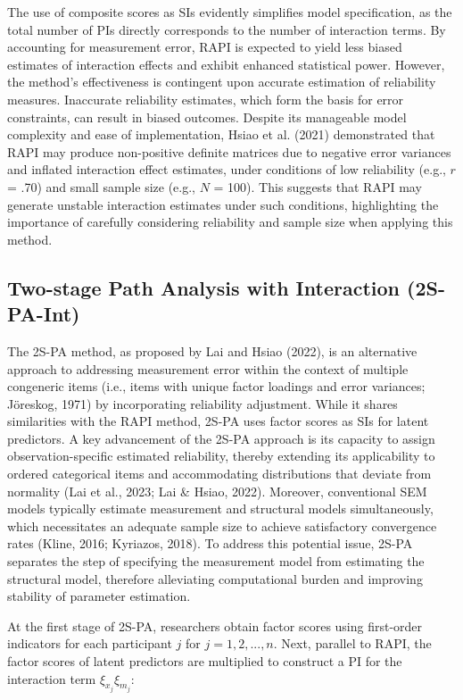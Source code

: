\documentclass[
  man]{apa6}
\begin{document}
The use of composite scores as SIs evidently simplifies model specification, as the total number of PIs directly corresponds to the number of interaction terms. By accounting for measurement error, RAPI is expected to yield less biased estimates of interaction effects and exhibit enhanced statistical power. However, the method's effectiveness is contingent upon accurate estimation of reliability measures. Inaccurate reliability estimates, which form the basis for error constraints, can result in biased outcomes. Despite its manageable model complexity and ease of implementation, Hsiao et al. (2021) demonstrated that RAPI may produce non-positive definite matrices due to negative error variances and inflated interaction effect estimates, under conditions of low reliability (e.g., \(\textit{r}\) = .70) and small sample size (e.g., \(\textit{N}\) = 100). This suggests that RAPI may generate unstable interaction estimates under such conditions, highlighting the importance of carefully considering reliability and sample size when applying this method.

\subsection{Two-stage Path Analysis with Interaction (2S-PA-Int)}\label{two-stage-path-analysis-with-interaction-2s-pa-int}

The 2S-PA method, as proposed by Lai and Hsiao (2022), is an alternative approach to addressing measurement error within the context of multiple congeneric items (i.e., items with unique factor loadings and error variances; Jöreskog, 1971) by incorporating reliability adjustment. While it shares similarities with the RAPI method, 2S-PA uses factor scores as SIs for latent predictors. A key advancement of the 2S-PA approach is its capacity to assign observation-specific estimated reliability, thereby extending its applicability to ordered categorical items and accommodating distributions that deviate from normality (Lai et al., 2023; Lai \& Hsiao, 2022). Moreover, conventional SEM models typically estimate measurement and structural models simultaneously, which necessitates an adequate sample size to achieve satisfactory convergence rates (Kline, 2016; Kyriazos, 2018). To address this potential issue, 2S-PA separates the step of specifying the measurement model from estimating the structural model, therefore alleviating computational burden and improving stability of parameter estimation.

At the first stage of 2S-PA, researchers obtain factor scores using first-order indicators for each participant \(j\) for \(j = 1, 2, ..., n\). Next, parallel to RAPI, the factor scores of latent predictors are multiplied to construct a PI for the interaction term \(\xi_{x_{j}}\xi_{m_{j}}\):
\end{document}
